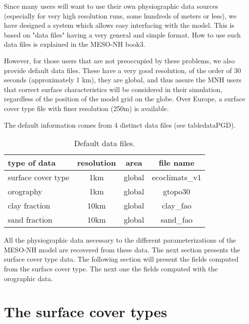 Since many users will want to use their own physiographic data sources
(especially for very high resolution runs, some hundreds of meters or less),
we have designed a system which allows easy interfacing with the model.
This is based on "data files" having a very general and simple format.
How to use such data files is explained in the MESO-NH book3.

However, for those users that are not preoccupied by these problems,
we also provide default data files.
These have a very good resolution, of the order of 30 seconds (approximately
1 km), they are global, and thus assure the MNH users that
correct surface characteristics will be considered in their simulation,
regardless of the position of the model grid on the globe.
Over Europe, a surface cover type file with finer resolution (250m)
is available.

The default information comes from 4 distinct data files (see table{dataPGD}).

\begin{table}
\hspace*{2.cm}
\begin{tabular}{||l||c|c|c||}
\hline
\hline
type of data & resolution & area & file name \\
\hline
\hline
surface cover type & 1km & global & ecoclimats\_v1 \\
\hline
orography          & 1km & global & gtopo30 \\
\hline
clay fraction & 10km & global & clay\_fao \\
\hline
sand fraction & 10km & global & sand\_fao \\
\hline
\hline
\end{tabular}
\caption{Default data files.
\label{dataPGD}}
\end{table}

All the physiographic data necessary to the different parameterizations
of the MESO-NH model are recovered from these data.
The next section presents the surface cover type data.
The following section
will present the fields computed from the surface cover type. The next
one the fields computed with the orographic data.


\section{The surface cover types}

